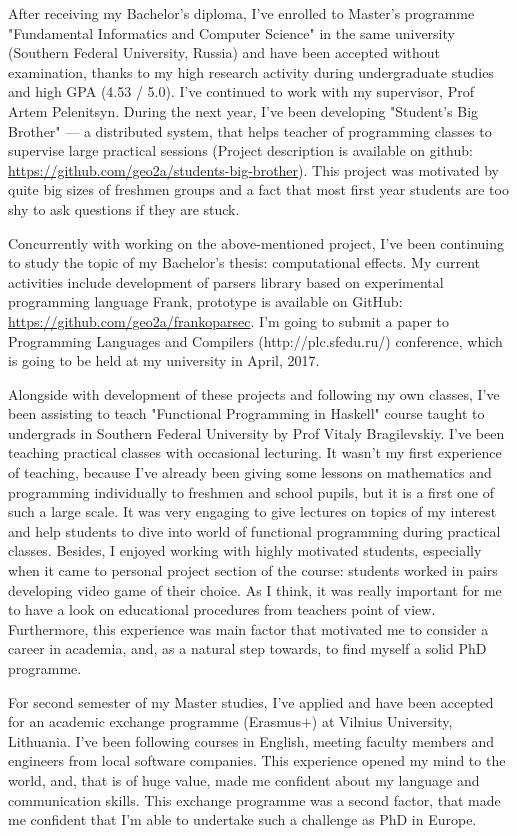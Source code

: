 \documentclass[11pt,a4paper,roman]{moderncv} %
\begin{document}
After receiving my Bachelor's diploma, I've enrolled to Master's
programme "Fundamental Informatics and Computer Science" in the same university 
(Southern Federal University, Russia) and have been accepted without
examination, thanks to my high research activity during undergraduate studies
and high GPA (4.53 / 5.0). I've continued to work with my supervisor, 
Prof Artem Pelenitsyn. During the next year, I've been developing
"Student's Big Brother" --- a distributed system, that helps teacher of 
programming classes to supervise large practical sessions 
(Project description is available on github:
\url{https://github.com/geo2a/students-big-brother}). This project was motivated
by quite big sizes of freshmen groups and a fact that most first year students 
are too shy to ask questions if they are stuck. 

Concurrently with working on the above-mentioned project, I've been continuing
to study the topic of my Bachelor's thesis: computational effects. My current
activities include development of parsers library based on experimental
programming language Frank, prototype is available on GitHub: 
\url{https://github.com/geo2a/frankoparsec}. I'm going to submit a paper to
Programming Languages and Compilers (http://plc.sfedu.ru/) conference, 
which is going to be held at my university in April, 2017.  

Alongside with development of these projects and following my own classes, 
I've been assisting to teach "Functional Programming in Haskell" course taught 
to undergrads in Southern Federal University by Prof Vitaly Bragilevskiy. 
I've been teaching practical classes with occasional lecturing.
It wasn't my first experience of teaching, because I've already been
giving some lessons on mathematics and programming individually to freshmen 
and school pupils, but it is a first one of such a large scale. 
It was very engaging to give lectures on topics of my interest and
help students to dive into world of functional programming during practical 
classes. Besides, I enjoyed working with highly motivated students, 
especially when it came to personal project section of the course:
students worked in pairs developing video game of their choice. 
As I think, it was really important for me to have a look on educational 
procedures from teachers point of view. Furthermore, this experience was main
factor that motivated me to consider a career in academia, and, as a natural step
towards, to find myself a solid PhD programme.

For second semester of my Master studies, I've applied and have been accepted 
for an academic exchange programme (Erasmus+) at Vilnius University, Lithuania. 
I've been following courses in English, meeting faculty members and engineers
from local software companies. This experience opened my mind to the world, and,
that is of huge value, made me confident about my language and communication
skills. This exchange programme was a second factor, that made me confident that
I'm able to undertake such a challenge as PhD in Europe.
\end{document}
